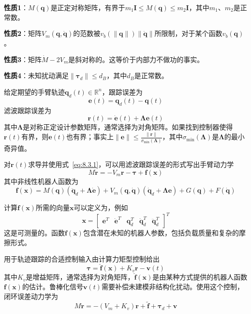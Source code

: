 \documentclass[12pt,a4paper]{ctexart}
\begin{document}
\textbf{性质1}：$M(\bm{q})$是正定对称矩阵，有界于$m_1\bm{I} \leq M(\bm{q}) \leq m_2\bm{I}$，其中$m_1$、$m_2$是正常数。

\textbf{性质2}：矩阵$V_m(\bm{q},\dot{\bm{q}})$的范数被$v_b(\|\bm{q}\|)\|\dot{\bm{q}}\|$所限制，对于某个函数$v_b(\bm{q})$。

\textbf{性质3}：矩阵$\dot{M} - 2V_m$是斜对称的。这等价于内部力不做功的事实。

\textbf{性质4}：未知扰动满足$\|\bm{\tau}_d\| \leq d_B$，其中$d_B$是正常数。

给定期望的手臂轨迹$\bm{q}_d(t) \in \mathbb{R}^n$，跟踪误差为
\begin{equation}\label{eq:8.3.2}
\bm{e}(t) = \bm{q}_d(t) - \bm{q}(t)
\end{equation}
滤波跟踪误差为
\begin{equation}\label{eq:8.3.3}
\bm{r}(t) = \dot{\bm{e}}(t) + \bm{\Lambda}\bm{e}(t)
\end{equation}
其中$\bm{\Lambda}$是对称正定设计参数矩阵，通常选择为对角矩阵。如果找到控制器使得$\bm{r}(t)$有界，则$\bm{e}(t)$也有界；事实上$\|\bm{e}\| \leq \frac{\|\bm{r}\|}{\sigma_{\min}(\bm{\Lambda})}$，其中$\sigma_{\min}(\bm{\Lambda})$是$\bm{\Lambda}$的最小奇异值。

对$\bm{r}(t)$求导并使用式~\eqref{eq:8.3.1}，可以用滤波跟踪误差的形式写出手臂动力学
\begin{equation}\label{eq:8.3.4}
M\dot{\bm{r}} = -V_m\bm{r} - \bm{\tau} + \bm{f}(\bm{x})
\end{equation}
其中非线性机器人函数为
\begin{equation}\label{eq:8.3.5}
\bm{f}(\bm{x}) = M(\bm{q})\left(\ddot{\bm{q}}_d + \bm{\Lambda}\dot{\bm{e}}\right) + V_m(\bm{q},\dot{\bm{q}})\left(\dot{\bm{q}}_d + \bm{\Lambda}\bm{e}\right) + G(\bm{q}) + F(\dot{\bm{q}})
\end{equation}

计算$\bm{f}(\bm{x})$所需的向量$\bm{x}$可以定义为，例如
\begin{equation}\label{eq:8.3.6}
\bm{x} = \begin{bmatrix} \bm{e}^T & \dot{\bm{e}}^T & \bm{q}_d^T & \dot{\bm{q}}_d^T & \ddot{\bm{q}}_d^T \end{bmatrix}^T
\end{equation}
这是可测量的。函数$\bm{f}(\bm{x})$包含潜在未知的机器人参数，包括负载质量和复杂的摩擦形式。

用于轨迹跟踪的合适控制输入由计算力矩型控制给出
\begin{equation}\label{eq:8.3.7}
\bm{\tau} = \hat{\bm{f}}(\bm{x}) + K_v\bm{r} - \bm{v}(t)
\end{equation}
其中$K_v$是增益矩阵，通常选择为对角矩阵，$\hat{\bm{f}}(\bm{x})$是由某种方式提供的机器人函数$\bm{f}(\bm{x})$的估计。鲁棒化信号$\bm{v}(t)$需要补偿未建模非结构化扰动。使用这个控制，闭环误差动力学为
\begin{equation}\label{eq:8.3.8}
M\dot{\bm{r}} = -(V_m + K_v)\bm{r} + \tilde{\bm{f}} + \bm{\tau}_d + \bm{v}
\end{equation}
\end{document}
